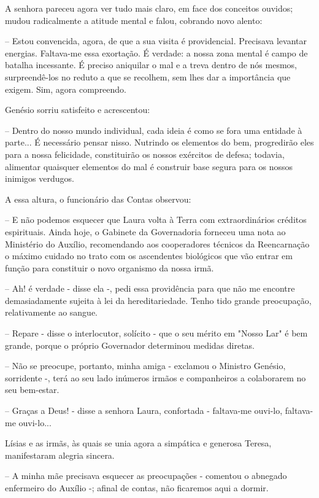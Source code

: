\documentclass[portuguese,12pt,a4paper]{scrbook}
\begin{document}
	A senhora pareceu agora ver tudo mais claro, em face dos conceitos ouvidos; mudou radicalmente a atitude mental e falou, cobrando novo alento:
	
	– Estou convencida, agora, de que a sua visita é providencial. Precisava levantar energias. Faltava-me essa exortação. É verdade: a nossa zona mental é campo de batalha incessante. É preciso aniquilar o mal e a treva dentro de nós mesmos, surpreendê-los no reduto a que se recolhem, sem lhes dar a importância que exigem. Sim, agora compreendo.
	
	
	Genésio sorriu satisfeito e acrescentou:
	
	– Dentro do nosso mundo individual, cada ideia é como se fora uma entidade à parte... É necessário pensar nisso. Nutrindo os elementos do bem, progredirão eles para a nossa felicidade, constituirão os nossos exércitos de defesa; todavia, alimentar quaisquer elementos do mal é construir base segura para os nossos inimigos verdugos.
	
	A essa altura, o funcionário das Contas observou:
	
	– E não podemos esquecer que Laura volta à Terra com extraordinários créditos espirituais. Ainda hoje, o Gabinete da Governadoria forneceu uma nota ao Ministério do Auxílio, recomendando aos cooperadores técnicos da Reencarnação o máximo cuidado no trato com os ascendentes biológicos que vão entrar em função para constituir o novo organismo da nossa irmã.
	
	– Ah! é verdade - disse ela -, pedi essa providência para que não me encontre demasiadamente sujeita à lei da hereditariedade. Tenho tido grande preocupação, relativamente ao sangue.
	
	– Repare - disse o interlocutor, solícito - que o seu mérito em "Nosso Lar" é bem grande, porque o próprio Governador determinou medidas diretas.
	
	– Não se preocupe, portanto, minha amiga - exclamou o Ministro Genésio, sorridente -, terá ao seu lado inúmeros irmãos e companheiros a colaborarem no seu bem-estar.
	
	– Graças a Deus! - disse a senhora Laura, confortada - faltava-me ouvi-lo, faltava-me ouvi-lo...
	
	Lísias e as irmãs, às quais se unia agora a simpática e generosa Teresa, manifestaram alegria sincera.
	
	– A minha mãe precisava esquecer as preocupações - comentou o abnegado enfermeiro do Auxílio -; afinal de contas, não ficaremos aqui a dormir.
	
\end{document}
